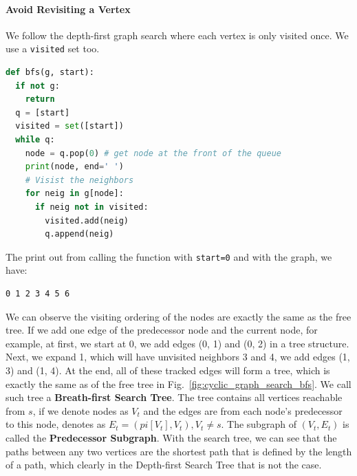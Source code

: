 \documentclass[main.tex]{subfiles}
\begin{document}
\paragraph{Avoid Revisiting a Vertex} We follow the depth-first graph search where each vertex is only visited once. We use a \texttt{visited} set too. 
\begin{lstlisting}[language=Python]
def bfs(g, start):
  if not g:
    return 
  q = [start]
  visited = set([start])
  while q:
    node = q.pop(0) # get node at the front of the queue
    print(node, end=' ')
    # Visist the neighbors
    for neig in g[node]:
      if neig not in visited:
        visited.add(neig)
        q.append(neig)
\end{lstlisting}
The print out from calling the function with \texttt{start=0} and with the graph, we have:
\begin{lstlisting}[numbers=none]
0 1 2 3 4 5 6 
\end{lstlisting}
We can observe the visiting ordering of the nodes are exactly the same as the free tree. If we add one edge of the predecessor node and the current node, for example, at first, we start at 0, we add edges (0, 1) and (0, 2) in a tree structure. Next, we expand 1, which will have unvisited neighbors 3 and 4, we add edges (1, 3) and (1, 4). At the end, all of these tracked edges will form a tree, which is exactly the same as of the free tree in Fig.~\ref{fig:cyclic_graph_search_bfs}.  We call such tree a \textbf{Breath-first Search Tree}. The tree contains all vertices reachable from $s$, if we denote nodes as $V_t$ and the edges are from each node's predecessor to this node, denotes as $E_t = {(pi[V_t], V_t), V_t \neq s}$. The subgraph of $(V_t, E_t)$ is called the \textbf{Predecessor Subgraph}.  With the search tree, we can see that the paths between any two vertices are the shortest path that is defined by the length of a path, which clearly in the Depth-first Search Tree that is not the case. 
\end{document}
